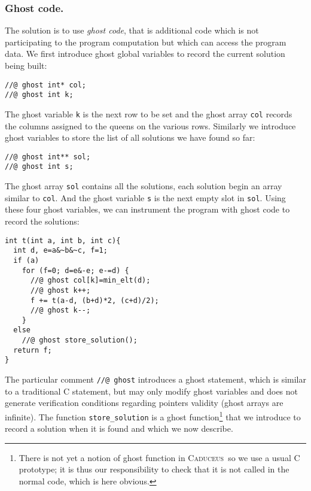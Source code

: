 \documentclass[a4paper]{llncs}
\newcommand{\caduceus}{\textsc{Caduceus}}
\begin{document}
\subsubsection{Ghost code.} The solution is to
use \emph{ghost code}, that is additional code which is not
participating to the program computation but which can access the
program data. We first introduce ghost global variables to record the 
current solution being built:
\begin{verbatim}
//@ ghost int* col;
//@ ghost int k;
\end{verbatim}
The ghost variable \texttt{k} is the next row to be set and the ghost
array \texttt{col} records the columns assigned to the queens on the
various rows. Similarly we introduce ghost variables to store the list of
all solutions we have found so far:
\begin{verbatim}
//@ ghost int** sol;
//@ ghost int s;
\end{verbatim}
The ghost array \texttt{sol} contains all the solutions, each
solution begin an array similar to \texttt{col}.
And the ghost variable \texttt{s} is the next empty slot in \texttt{sol}. 
Using these four ghost variables, we can instrument the program with
ghost code to record the solutions:
\begin{verbatim}
int t(int a, int b, int c){
  int d, e=a&~b&~c, f=1;
  if (a)
    for (f=0; d=e&-e; e-=d) {
      //@ ghost col[k]=min_elt(d);
      //@ ghost k++;
      f += t(a-d, (b+d)*2, (c+d)/2);
      //@ ghost k--;
    }
  else 
    //@ ghost store_solution();
  return f;
}
\end{verbatim}
The particular comment \verb!//@ ghost! introduces a ghost statement,
which is similar to a traditional C statement, but may only modify
ghost variables and does not generate verification conditions
regarding pointers validity (ghost arrays are infinite).
The function \texttt{store\_solution} is a ghost
function\footnote{There is not yet a notion of ghost function in
  \caduceus\ so we use a usual C prototype; it is thus our
  responsibility to check that it is not called in the normal code,
  which is here obvious.} that we introduce to record a solution when
it is found and which we now describe.
\end{document}
